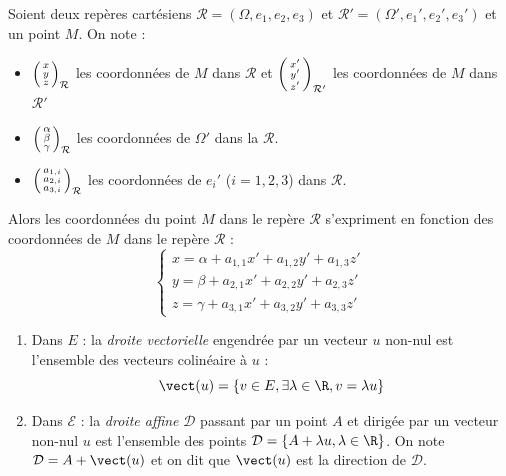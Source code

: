 Soient deux repères cartésiens $\mathcal R =(\Omega,e_1,e_2,e_3) $ et $\mathcal R' =(\Omega',e_1',e_2',e_3') $ et un point $M$. On note :
\begin{itemize}
	\item $\begin{psmallmatrix}x\\ y \\z \end{psmallmatrix}_{\mathcal R}$ les coordonnées de $M$ dans $\mathcal R$ et $\begin{psmallmatrix}x'\\y'\\z' \end{psmallmatrix}_{\mathcal R'}$ les coordonnées de $M$ dans $\mathcal R'$
	\item $\begin{psmallmatrix}\alpha\\\beta\\\gamma \end{psmallmatrix}_{\mathcal R}$ les coordonnées de $\Omega'$ dans la $\mathcal R$.
	\item $\begin{psmallmatrix} a_{1,i}\\a_{2,i}\\a_{3,i} \end{psmallmatrix}_{\mathcal R}$ les coordonnées de $e_i'$ ($i=1,2,3$) dans $\mathcal R$.
\end{itemize}
Alors les coordonnées du point $M$ dans le repère $\mathcal R$ s'expriment en fonction des coordonnées de $M$ dans le repère $\mathcal R$ :
\[
	\begin{cases}
		x = \alpha +a_{1,1}x'+ a_{1,2}y' +a_{1,3} z'\\
		y = \beta  +a_{2,1}x'+ a_{2,2}y' +a_{2,3} z'\\
		z = \gamma +a_{3,1}x'+ a_{3,2}y' +a_{3,3} z'
	\end{cases}
\]


\begin{definition}
	\begin{enumerate}
		\item Dans $E$ : la \emph{droite vectorielle} engendrée par un vecteur $u$ non-nul est l'ensemble des vecteurs colinéaire à $u$ :
			\[
				\vect(u) = \left\{ v\in E, \exists \lambda \in \R, v = \lambda u \right\}
			\]

		\item	Dans $\mathcal E$ : la \emph{droite affine} $\mathcal D$ passant par un point $A$ et dirigée par un vecteur non-nul $u$ est l'ensemble des points $\mathcal D = \left\{ A + \lambda u, \lambda \in \R \right\}$. On note $\mathcal D = A + \vect (u)$ et on dit que $\vect(u)$ est la direction de $\mathcal D$.
	\end{enumerate}
\end{definition}

